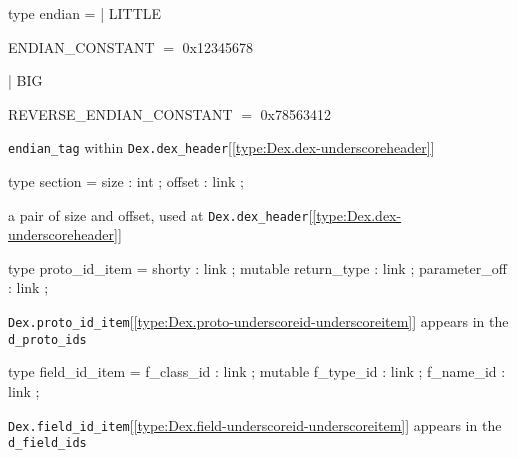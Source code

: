 \documentclass[11pt]{article}
\begin{document}
\label{type:Dex.endian}\begin{ocamldoccode}
type endian =
  | LITTLE
\end{ocamldoccode}
\begin{ocamldoccomment}
ENDIAN\_CONSTANT         $=$ 0x12345678
\end{ocamldoccomment}
\begin{ocamldoccode}
  | BIG
\end{ocamldoccode}
\begin{ocamldoccomment}
REVERSE\_ENDIAN\_CONSTANT $=$ 0x78563412
\end{ocamldoccomment}
\begin{ocamldocdescription}
{\tt{endian\_tag}} within {\tt{Dex.dex\_header}}[\ref{type:Dex.dex-underscoreheader}]


\end{ocamldocdescription}




\label{type:Dex.section}\begin{ocamldoccode}
type section = {}
  size : int ;
  offset : link ;
{}
\end{ocamldoccode}
\begin{ocamldocdescription}
a pair of size and offset, used at {\tt{Dex.dex\_header}}[\ref{type:Dex.dex-underscoreheader}]


\end{ocamldocdescription}




\label{type:Dex.proto-underscoreid-underscoreitem}\begin{ocamldoccode}
type proto_id_item = {}
  shorty : link ;
  mutable return_type : link ;
  parameter_off : link ;
{}
\end{ocamldoccode}
\begin{ocamldocdescription}
{\tt{Dex.proto\_id\_item}}[\ref{type:Dex.proto-underscoreid-underscoreitem}] appears in the {\tt{d\_proto\_ids}}


\end{ocamldocdescription}




\label{type:Dex.field-underscoreid-underscoreitem}\begin{ocamldoccode}
type field_id_item = {}
  f_class_id : link ;
  mutable f_type_id : link ;
  f_name_id : link ;
{}
\end{ocamldoccode}
\begin{ocamldocdescription}
{\tt{Dex.field\_id\_item}}[\ref{type:Dex.field-underscoreid-underscoreitem}] appears in the {\tt{d\_field\_ids}}


\end{ocamldocdescription}
\end{document}
